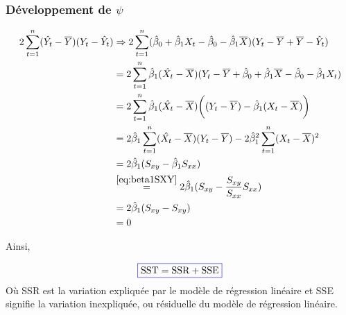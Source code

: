 \documentclass[11pt,french]{report}
\begin{document}
\subsubsection*{Développement de $\psi$}
\begin{align*}
2 \sum_{t=1}^n (\hat{Y_t} - \overline{Y})(Y_t - \hat{Y}_t) &\Rightarrow 2 \sum_{t=1}^n (\hat{\beta}_0 + \hat{\beta}_1X_t - \hat{\beta}_0 - \hat{\beta}_1\overline{X})(Y_t - \overline{Y} + \overline{Y} - \hat{Y}_t) \\
&= 2 \sum_{t=1}^n \hat{\beta}_1 (\hat{X_t} - \overline{X}) (Y_t - \overline{Y} + \hat{\beta}_0 + \hat{\beta}_1\overline{X} - \hat{\beta}_0 - \hat{\beta}_1 X_t) \\
&= 2 \sum_{t=1}^n \hat{\beta}_1 (\hat{X_t} - \overline{X}) \bigg((Y_t - \overline{Y}) - \hat{\beta}_1(X_t - \overline{X}) \bigg)\\
&= 2 \hat{\beta}_1 \sum_{t=1}^n  (\hat{X_t} - \overline{X})(Y_t - \overline{Y}) - 2 \hat{\beta}_1^2 \sum_{t=1}^n (X_t - \overline{X})^2\\
&= 2 \hat{\beta}_1 (S_{xy} - \hat{\beta}_1S_{xx})\\
& \overset{\ref{eq:beta1SXY}}{=} 2 \hat{\beta}_1 (S_{xy} - \frac{S_{xy}}{S_{xx}}S_{xx})\\
&= 2 \hat{\beta}_1 (S_{xy} - S_{xy})\\
&= 0 \\
\end{align*}

Ainsi, 

\begin{equation}
\label{eq:SST}
\color{blue}
\boxed{\color{black}
\text{SST} = \text{SSR} + \text{SSE}}
\end{equation}
Où SSR est la variation expliquée par le modèle de régression linéaire et SSE signifie la variation inexpliquée, ou résiduelle du modèle de régression linéaire.
\bigskip
\end{document}
